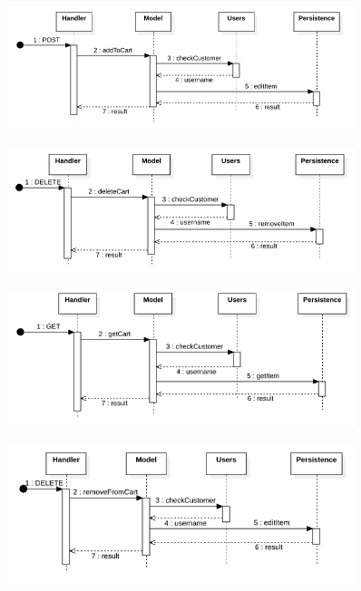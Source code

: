 \begin{figure}[H]
    \includegraphics[width=0.9\textwidth]{res/images/sequence-diagrams/carts/addToCart.png}
\end{figure}

\begin{figure}[H]
    \includegraphics[width=0.9\textwidth]{res/images/sequence-diagrams/carts/deleteCart.png}
\end{figure}

\begin{figure}[H]
    \includegraphics[width=0.9\textwidth]{res/images/sequence-diagrams/carts/getCart.png}
\end{figure}

\begin{figure}[H]
    \includegraphics[width=0.9\textwidth]{res/images/sequence-diagrams/carts/removeFromCart.png}
\end{figure}

